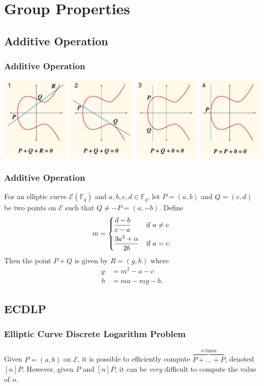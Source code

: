\documentclass{beamer}
\begin{document}
    \section{Group Properties}
    \subsection{Additive Operation}
    \begin{frame}
        \frametitle{Additive Operation}
        \centering
        \includegraphics[width=\textwidth]{ECClines.pdf}
    \end{frame}

    \begin{frame}[label=add]
        \frametitle{Additive Operation}
        \begin{theorem}
            For an elliptic curve \(\mathcal{E}(\mathbb{F}_q)\)
            and \(a, b, c, d \in \mathbb{F}_q\),
            let \(P = (a, b)\) and \(Q = (c, d)\) be two points
            on \(\mathcal{E}\) such that \(Q \neq -P = (a, -b)\). Define
            \[m =
                \begin{dcases}
                    \frac{d - b}{c - a} & \textnormal{if}\ a \neq c \\
                    \frac{3a^2 + \alpha}{2b} & \textnormal{if}\ a = c.
                \end{dcases}\]
            Then the point \(P + Q\) is given by \(R = (g, h)\) where
            \begin{align*}
                g &= m^2 - a - c \\
                h &= ma - mg - b.
            \end{align*}
        \end{theorem}
        \hyperlink{addproof}{}
    \end{frame}

    \subsection{ECDLP}
    \begin{frame}
        \frametitle{Elliptic Curve Discrete Logarithm Problem}
        Given \(P = (a, b)\) on \(\mathcal{E}\), it is possible to
        efficiently compute \(\overbrace{P + \dots + P}^{n\ \textrm{times}}\),
        denoted \([n]P\).
        \vfill
        However, given \(P\) and \([n]P\), it can be \emph{very} difficult to
        compute the value of \(n\).
    \end{frame}
\end{document}
